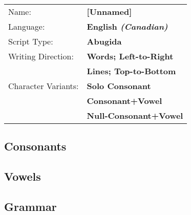\label{AbR}
\newpage
\begin{tabular}{@{}l l@{}}
Name:               & \textbf{[Unnamed]}                  \\
Language:           & \textbf{English \emph{(Canadian)}}  \\
Script Type:        & \textbf{Abugida}                    \\
Writing Direction:  & \textbf{Words; Left-to-Right}       \\
                    & \textbf{Lines; Top-to-Bottom}       \\
Character Variants: & \textbf{Solo Consonant}             \\
                    & \textbf{Consonant+Vowel}            \\
                    & \textbf{\gls{Null-Consonant}+Vowel}%
\end{tabular}


\newpage
\subsection{Consonants}


\newpage
\subsection{Vowels}


\newpage
\subsection{Grammar}
